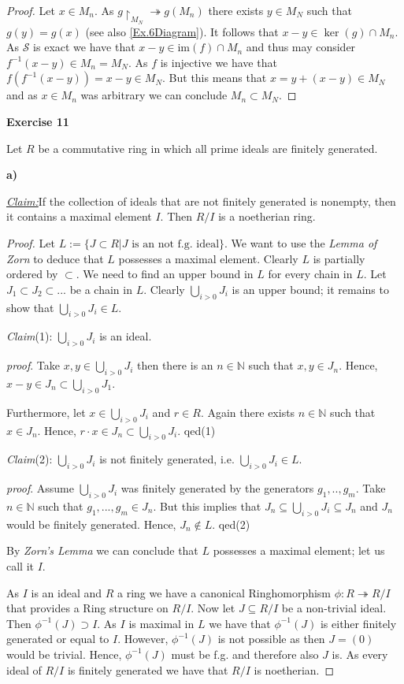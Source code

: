 \documentclass{article}
\newcommand{\contradiction}{\lightning}
\newcommand{\N}{\mathbb{N}}
\newcommand{\im}{\mathrm{im}}
\newcommand{\inv}[1]{{#1}^{-1}}
\newcommand{\claim}
{\underline{\textit{Claim:}}\hspace{0,2cm}}
\newcommand{\subclaim}[1]
{

	\vspace*{0,2cm}
	\textit{Claim}({#1}):
}
\newcommand{\subqed}[1]{\hfill\textsf{qed}({#1})}
\newcommand{\subproof}{

\noindent\textit{proof}.\hspace{0,1cm}
}
\newcommand{\aufgabe}[1]{
{
	\vspace*{0.5cm}
	\noindent\textsf{\textbf{Exercise #1}}
	\vspace*{0.2cm}

}
}
\newcommand{\teilaufgabe}[1]{
{       

	\noindent\hspace*{0,1 cm}\textbf{#1)}
}
}
\theoremstyle{definition}
\theoremstyle{plain}
\theoremstyle{remark}
\begin{document}
\begin{proof}
Let $x\in M_n$. As $g\restriction_{M_N} \twoheadrightarrow g(M_n)$ there exists $y\in M_N$ such that $g(y) = g(x)$ (see also \cref{Ex.6Diagram}). It follows that $x-y\in \ker(g)\cap M_n$. As $\mathcal{S}$ is exact we have that $x-y\in\im(f)\cap M_n$ and thus may consider $f^{-1}(x-y)\in M_n = M_N$. As $f$ is injective we have that $f(\inv{f}(x-y))= x-y \in M_N$. But this means that $x = y + (x-y) \in M_N$ and as $x\in M_n$ was arbitrary we can conclude $M_n\subset M_N$.
\end{proof}

\aufgabe{11}
Let $R$ be a commutative ring in which all prime ideals are finitely generated.
\teilaufgabe{a} \claim If the collection of ideals that are not finitely generated is nonempty, then it contains a maximal element $I$. Then $R/I$ is a noetherian ring.
\begin{proof}
	Let $L:=\{J\subset R | J \text{ is an not f.g. ideal}\}$. We want to use the \emph{Lemma of Zorn} to deduce that $L$ possesses a maximal element. Clearly $L$ is partially ordered by $\subset$. We need to find an upper bound in $L$ for every chain in $L$. Let $J_1\subset J_2 \subset ...$ be a chain in $L$. Clearly $\bigcup_{i>0}J_i$ is an upper bound; it remains to show that $\bigcup_{i>0}J_i\in L$.  
	\subclaim1 $\bigcup_{i>0}J_i$  is an ideal.
	\subproof Take $x,y\in \bigcup_{i>0}J_i$ then there is an $n\in \N$ such that $x,y\in J_n$. Hence, $x-y\in J_n \subset \bigcup_{i>0}J_1$.
	
	Furthermore, let $x\in \bigcup_{i>0}J_i$ and $r\in R$. Again there exists $n\in \N$ such that $x\in J_n$. Hence, $r\cdot x \in J_n\subset \bigcup_{i>0}J_i$. \subqed1
	\subclaim2 $\bigcup_{i>0}J_i$ is not finitely generated, i.e. $\bigcup_{i>0}J_i\in L$.
	\subproof Assume $\bigcup_{i>0}J_i$ was finitely generated by the generators $g_1,..,g_m$. Take $n\in\N$ such that $g_1,...,g_m \in J_n$. But this implies that $J_n\subseteq\bigcup_{i>0}J_i\subseteq J_n$ and $J_n$ would be finitely generated. Hence, $J_n\notin L$. \contradiction \subqed2

	By \emph{Zorn's Lemma} we can conclude that $L$ possesses a maximal element; let us call it $I$.

	As $I$ is an ideal and $R$ a ring we have a canonical Ringhomorphism $\phi:R\twoheadrightarrow R/I$ that provides a Ring structure on $R/I$.
	Now let $J\subseteq R/I$ be a non-trivial ideal. Then $\inv{\phi}(J) \supset I$. As $I$ is maximal in $L$ we have that $\inv{\phi}(J)$ is either finitely generated or equal to $I$. However, $\inv{\phi}(J)$ is not possible as then $J = (0)$ would be trivial. Hence, $\inv{\phi}(J)$ must be f.g. and therefore also $J$ is. 
	As every ideal of $R/I$ is finitely generated we have that $R/I$ is noetherian.
\end{proof}
\end{document}
